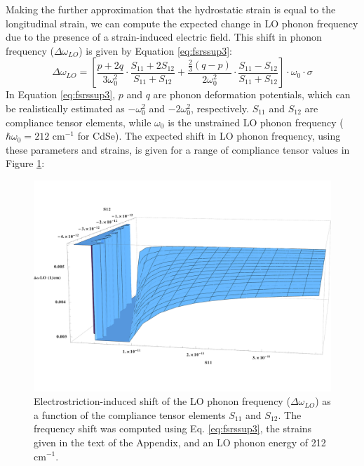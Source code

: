 Making the further approximation that the hydrostatic strain is equal to the longitudinal strain, we can compute the expected change in LO phonon frequency due to the presence of a strain-induced electric field. This shift in phonon frequency ($\Delta\omega_{LO}$) is given by Equation \ref{eq:fsrssup3}:
\begin{equation}\label{eq:fsrssup3}
\Delta\omega_{LO} = \left[\frac{p + 2q}{3\omega_0^2} \cdot \frac{S_{11} + 2S_{12}}{S_{11} + S_{12}} + \frac{\frac{2}{3}\left(q - p\right)}{2\omega_0^2} \cdot \frac{S_{11} - S_{12}}{S_{11} + S_{12}}\right] \cdot \omega_0 \cdot \sigma
\end{equation}
In Equation \ref{eq:fsrssup3}, $p$ and $q$ are phonon deformation potentials, which can be realistically estimated as $-\omega_0^2$ and $-2\omega_0^2$, respectively. $S_{11}$ and $S_{12}$ are compliance tensor elements, while $\omega_0$ is the unstrained LO phonon frequency ($\hbar\omega_0 = 212$ cm$^{-1}$ for CdSe). The expected shift in LO phonon frequency, using these parameters and strains, is given for a range of compliance tensor values in Figure \ref{f:fsrssup2}: \par

\begin{figure}
\begin{center}
\includegraphics[width=\textwidth]{./appendixB/fsrssup2.pdf}
\caption[Expected electrostriction-induced shift of the LO phonon frequency in CdSe for a range of compliance tensor values.]{Electrostriction-induced shift of the LO phonon frequency ($\Delta\omega_{LO}$) as a function of the compliance tensor elements $S_{11}$ and $S_{12}$. The frequency shift was computed using Eq. \ref{eq:fsrssup3}, the strains given in the text of the Appendix, and an LO phonon energy of 212 cm$^{-1}$.}
\label{f:fsrssup2}
\end{center}
\end{figure}

